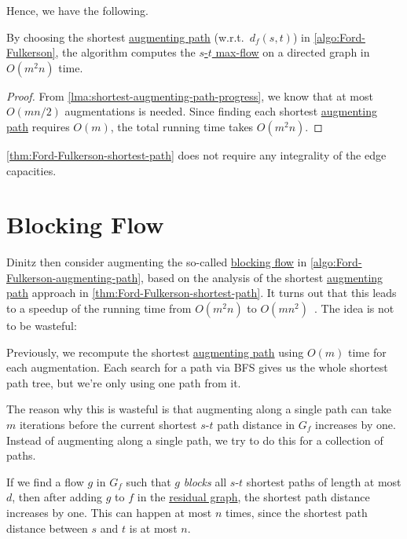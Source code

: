 Hence, we have the following.

\begin{theorem}\label{thm:Ford-Fulkerson-shortest-path}
	By choosing the shortest \hyperref[def:augmenting-path]{augmenting path} (w.r.t.\ \(d_f(s, t)\)) in \autoref{algo:Ford-Fulkerson}, the algorithm computes the \hyperref[prb:s-t-max-flow]{\(s\)-\(t\) max-flow} on a directed graph in \(O(m^2 n)\) time.
\end{theorem}
\begin{proof}
	From \autoref{lma:shortest-augmenting-path-progress}, we know that at most \(O(mn / 2)\) augmentations is needed. Since finding each shortest \hyperref[def:augmenting-path]{augmenting path} requires \(O(m)\), the total running time takes \(O(m^2 n)\).
\end{proof}

\begin{remark}
	\autoref{thm:Ford-Fulkerson-shortest-path} does not require any integrality of the edge capacities.
\end{remark}

\section{Blocking Flow}
Dinitz then consider augmenting the so-called \hyperref[def:blocking-flow]{blocking flow} in \autoref{algo:Ford-Fulkerson-augmenting-path}, based on the analysis of the shortest \hyperref[def:augmenting-path]{augmenting path} approach in \autoref{thm:Ford-Fulkerson-shortest-path}. It turns out that this leads to a speedup of the running time from \(O(m^2 n)\) to \(O(mn^2)\)~\cite{karzanov1973finding,dinic1970algorithm,goldberg1998beyond}. The idea is not to be wasteful:

\begin{prev}
	Previously, we recompute the shortest \hyperref[def:augmenting-path]{augmenting path} using \(O(m)\) time for each augmentation. Each search for a path via BFS gives us the whole shortest path tree, but we're only using one path from it.
\end{prev}

The reason why this is wasteful is that augmenting along a single path can take \(m\) iterations before the current shortest \(s\)-\(t\) path distance in \(G_f\) increases by one. Instead of augmenting along a single path, we try to do this for a collection of paths.

\begin{intuition}
	If we find a flow \(g\) in \(G_f\) such that \(g\) \emph{blocks} all \(s\)-\(t\) shortest paths of length at most \(d\), then after adding \(g\) to \(f\) in the \hyperref[def:residual-graph]{residual graph}, the shortest path distance increases by one. This can happen at most \(n\) times, since the shortest path distance between \(s\) and \(t\) is at most \(n\).
\end{intuition}

